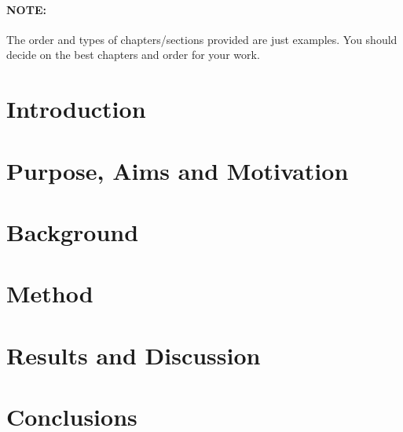 \documentclass[a4paper,12pt]{article}
\begin{document}
\tableofcontents

\clearpage

\printglossary[title=Acronyms, toctitle=Acronyms]

\cleardoublepage

\mainmatter



\paragraph{NOTE:} The order and types of chapters/sections provided are just examples. You should decide on the best chapters and order for your work.

\section{Introduction}
\label{sec:introduction}


\section{Purpose, Aims and Motivation}
\label{sec:purpose}


\section{Background}
\label{sec:background}


\section{Method}
\label{sec:method}


\section{Results and Discussion}
\label{sec:result_discussion}


\section{Conclusions}
\label{sec:conclusions}

\end{document}
